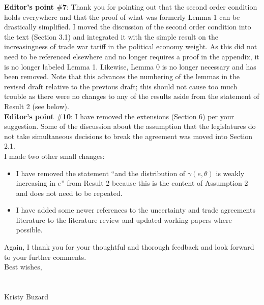 \documentclass[12pt]{report}
\begin{document}
\textbf{Editor's point $\#$7}: Thank you for pointing out that the second order condition holds everywhere and that the proof of what was formerly Lemma 1 can be drastically simplified. I moved the discussion of the second order condition into the text (Section 3.1) and integrated it with the simple result on the increasingness of trade war tariff in the political economy weight. As this did not need to be referenced elsewhere and no longer requires a proof in the appendix, it is no longer labeled Lemma 1. Likewise, Lemma 0 is no longer necessary and has been removed. Note that this advances the numbering of the lemmas in the revised draft relative to the previous draft; this should not cause too much trouble as there were no changes to any of the results aside from the statement of Result 2 (see below). \\

\textbf{Editor's point $\#$10}: I have removed the extensions (Section 6) per your suggestion. Some of the discussion about the assumption that the legislatures do not take simultaneous decisions to break the agreement was moved into Section 2.1. \\


I made two other small changes:
\begin{itemize}
	\item I have removed the statement ``and the distribution of $\gamma(e,\theta)$ is weakly increasing in $e$'' from Result 2 because this is the content of Assumption 2 and does not need to be repeated.
	\item I have added some newer references to the uncertainty and trade agreements literature to the literature review and updated working papers where possible.\\
\end{itemize}

Again, I thank you for your thoughtful and thorough feedback and look forward to your further comments. \\

Best wishes,\\
\\
\\
Kristy Buzard
\end{document}
